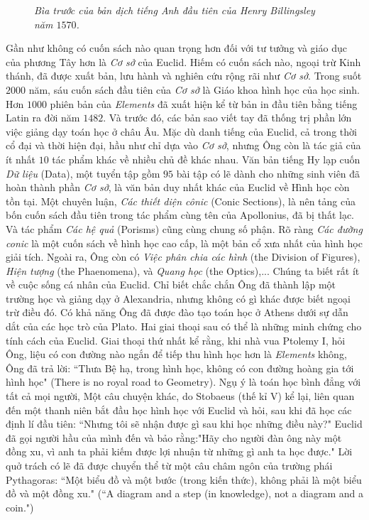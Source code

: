 \begin{multicols}{2}
\begin{figure}[H]
		\caption{\small\textit{\color{lichsutoanhoc}Bìa trước của bản dịch tiếng Anh đầu tiên của Henry Billingsley năm $1570$.}}
		\vspace*{-10pt}
		\end{figure} 
	Gần như không có cuốn sách nào quan trọng hơn đối với tư tưởng và giáo dục của phương Tây hơn là \textit{Cơ sở} của Euclid. Hiếm có cuốn sách nào, ngoại trừ Kinh thánh, đã được xuất bản, lưu hành và nghiên cứu rộng rãi như \textit{Cơ sở}. Trong suốt $2000$ năm, sáu cuốn sách đầu tiên của \textit{Cơ sở} là Giáo khoa hình học của học sinh. Hơn $1000$ phiên bản của \textit{Elements} đã xuất hiện kể từ bản in đầu tiên bằng tiếng Latin ra đời năm $1482$. Và trước đó, các bản sao viết tay đã thống trị phần lớn việc giảng dạy toán học ở châu Âu.
	\vskip 0.1cm
	Mặc dù danh tiếng của Euclid, cả trong thời cổ đại và thời hiện đại, hầu như chỉ dựa vào \textit{Cơ sở}, nhưng Ông còn là tác giả của ít nhất $10$ tác phẩm khác về nhiều chủ đề khác nhau. Văn bản tiếng Hy lạp cuốn \textit{Dữ liệu} (Data), một tuyển tập gồm $95$ bài tập có lẽ dành cho những sinh viên đã hoàn thành phần \textit{Cơ sở}, là văn bản duy nhất khác của Euclid về Hình học còn tồn tại. Một chuyên luận, \textit{Các thiết diện cônic} (Conic Sections), là nên tảng của bốn cuốn sách đầu tiên trong tác phẩm cùng tên của Apollonius, đã bị thất lạc. Và tác phẩm \textit{Các hệ quả} (Porisms) cũng cùng chung số phận. Rõ ràng \textit{Các đường conic} là một cuốn sách về hình học cao cấp, là một bản cổ xưa nhất của hình học giải tích. Ngoài ra, Ông còn có \textit{Việc phân chia các  hình} (the Division of Figures), \textit{Hiện tượng} (the Phaenomena), và \textit{Quang học} (the Optics),...
	\vskip 0.1cm
	Chúng ta biết rất ít về cuộc sống cá nhân của Euclid.  Chỉ biết chắc chắn Ông đã thành lập một trường học và giảng dạy ở Alexandria, nhưng không có gì khác được biết ngoại trừ điều đó. Có khả năng Ông đã được đào tạo toán học ở Athens dưới sự dẫn dắt của các học trò của Plato. Hai giai thoại sau có thể là những minh chứng cho tính cách của Euclid. Giai thoại thứ nhất kể rằng, khi nhà vua Ptolemy I, hỏi Ông, liệu có con đường nào ngắn để tiếp thu hình học hơn là \textit{Elements} không, Ông đã trả lời: ``Thưa Bệ hạ, trong hình học, không có con đường hoàng gia tới hình học" (There is no royal road to Geometry). Ngụ ý là toán học bình đẳng với tất cả mọi người, Một câu chuyện khác, do Stobaeus (thế kỉ V) kể lại, liên quan đến một thanh niên bắt đầu học hình học với Euclid và hỏi, sau khi đã học các định lí đầu tiên: ``Nhưng tôi sẽ nhận được gì sau khi học những điều này?" Euclid đã gọi người hầu của mình đến và bảo rằng:"Hãy cho người đàn ông này một đồng xu, vì anh ta phải kiếm được lợi nhuận từ những gì anh ta học được." Lời quở trách có lẽ đã được chuyển thể từ một câu châm ngôn của trường phái Pythagoras: ``Một biểu đồ và một bước (trong kiến thức), không phải là một biểu đồ và một đồng xu." (``A diagram and a step (in knowledge), not a diagram and a coin.")  

\end{multicols}

